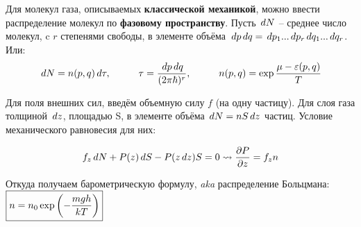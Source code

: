 
Для молекул газа, описываемых \textbf{классической механикой}, можно ввести распределение молекул по \textbf{фазовому пространству}.
Пусть $\, d N$ -- среднее число молекул, c $r$ степенями свободы, в элементе объёма $\, d p \, d q = \, d p_1 ... \, d p_r \, d q_1 ... \, d q_r$. Или: 
\begin{equation*}
 \, d N = n(p, q) \, d \tau, \hspace{1cm} \tau = \frac{\, d p \, d q}{(2 \pi \hbar)^r}, \hspace{1cm} n(p,q) = \exp \frac{\mu - \varepsilon(p,q)}{T}
\end{equation*}

Для поля внешних сил, введём объемную силу $f$ (на одну частицу). Для слоя газа толщиной $\, d z$, площадью S, в элементе объёма $\, d N = n S \, d z$ частиц. Условие механического равновесия для них:

\begin{equation*}
	f_z \, d N + P(z) \, d S - P(z \, d z) S = 0 \leadsto \frac{\partial P}{\partial z} = f_z n \\	
\end{equation*}

Откуда получаем барометрическую формулу, \textit{aka} распределение Больцмана: $\boxed{n = n_0 \exp{\left(-\frac{mgh}{kT}\right)}}$